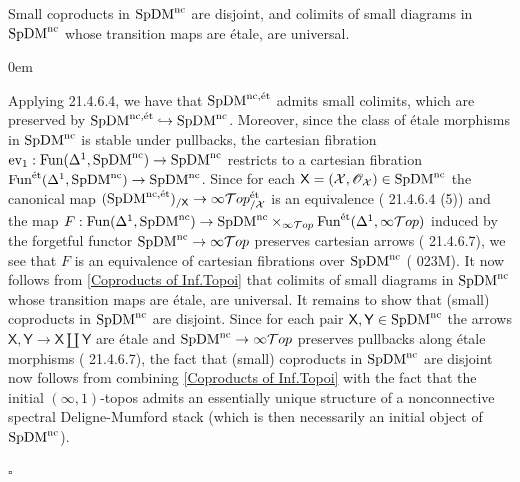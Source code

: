 \documentclass[10pt]{article}
\newcommand{\scO}{\mathscr O}
\newcommand{\cT}{\mathcal{T}}
\newcommand{\cX}{\mathcal{X}}
\newcommand{\sX}{\mathsf{X}}
\newcommand{\sY}{\mathsf{Y}}
\renewcommand{\qed}{\hfill$\square$}
\renewenvironment{proof}{\begin{addmargin}[1em]{0em}\begin{newproof}}{\end{newproof}\end{addmargin}\qed}
\theoremstyle{witharg}
\theoremstyle{witharg}
\theoremstyle{witharg2}
\begin{document}
\begin{corollary}{}\label{Coproducts in SpDM}

    Small coproducts in $\textnormal{SpDM}^{\textnormal{nc}}$ are disjoint, and colimits of small diagrams in $\textnormal{SpDM}^{\textnormal{nc}}$ whose transition maps are \'{e}tale, are universal. 
    
    
    
\end{corollary}

\begin{proof}

    Applying  21.4.6.4, we have that $\textnormal{SpDM}^{\textnormal{nc},\textnormal{\'{e}t}}$ admits small colimits, which are preserved by $\textnormal{SpDM}^{\textnormal{nc},\textnormal{\'{e}t}}\hookrightarrow \textnormal{SpDM}^{\textnormal{nc}}$. Moreover, since the class of \'{e}tale morphisms in $\textnormal{SpDM}^{\textnormal{nc}}$ is stable under pullbacks, the cartesian fibration $\textnormal{ev}_1:\textnormal{Fun}(\Delta^1,\textnormal{SpDM}^{\textnormal{nc}})\rightarrow \textnormal{SpDM}^{\textnormal{nc}}$ restricts to a cartesian fibration $\textnormal{Fun}^{\textnormal{\'{e}t}}(\Delta^1,\textnormal{SpDM}^{\textnormal{nc}})\rightarrow \textnormal{SpDM}^{\textnormal{nc}}$. Since for each $\sX=(\cX,\scO_\cX)\in \textnormal{SpDM}^{\textnormal{nc}}$ the canonical map $(\textnormal{SpDM}^{\textnormal{nc},\textnormal{\'{e}t}})_{/\sX}\rightarrow \infty\cT op^{\textnormal{\'{e}t}}_{/\cX}$ is an equivalence ( 21.4.6.4 (5)) and the map $F:\textnormal{Fun}(\Delta^1,\textnormal{SpDM}^{\textnormal{nc}})\rightarrow \textnormal{SpDM}^{\textnormal{nc}}\times_{\infty\cT op}\textnormal{Fun}^{\textnormal{\'{e}t}}(\Delta^1,\infty\cT op)$ induced by the forgetful functor $\textnormal{SpDM}^{\textnormal{nc}}\rightarrow \infty\cT op$ preserves cartesian arrows ( 21.4.6.7), we see that $F$ is an equivalence of cartesian fibrations over $\textnormal{SpDM}^{\textnormal{nc}}$ ( 023M). It now follows from  \ref{Coproducts of Inf.Topoi} that colimits of small diagrams in $\textnormal{SpDM}^{\textnormal{nc}}$ whose transition maps are \'{e}tale, are universal. It remains to show that (small) coproducts in $\textnormal{SpDM}^{\textnormal{nc}}$ are disjoint. Since for each pair $\sX,\sY\in \textnormal{SpDM}^{\textnormal{nc}}$ the arrows $\sX,\sY\rightarrow \sX\coprod\sY$ are \'{e}tale and $\textnormal{SpDM}^{\textnormal{nc}}\rightarrow \infty\cT op$ preserves pullbacks along \'{e}tale morphisms ( 21.4.6.7), the fact that (small) coproducts in $\textnormal{SpDM}^{\textnormal{nc}}$ are disjoint now follows from combining \ref{Coproducts of Inf.Topoi} with the fact that the initial $(\infty,1)$-topos admits an essentially unique structure of a nonconnective spectral Deligne-Mumford stack (which is then necessarily an initial object of $\textnormal{SpDM}^{\textnormal{nc}}$). 

    
\end{proof}
\end{document}
